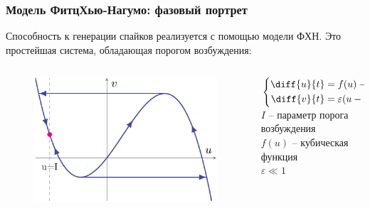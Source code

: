 \begin{frame}[t]
	\frametitle{Модель ФитцХью-Нагумо: фазовый портрет}
	Способность к генерации спайков реализуется с помощью модели ФХН. Это простейшая система, обладающая порогом возбуждения:
	\vspace{1em}
	\begin{columns}[c]
		\begin{column}{0.59\textwidth}
			\vspace{-3em}
			\begin{figure}[h]
				\centering
				\hspace{1em}\includegraphics[]{img/img_3a}
			\end{figure}
		\end{column}
		\begin{column}{0.39\textwidth}
			$
				\left\{
				\begin{aligned}
					\diff{u}{t} & =f(u)-v           \\
					\diff{v}{t} & =\varepsilon(u-I)
				\end{aligned}
				\right.
			$\\
			\vspace{1em}
			$I$ -- параметр порога возбуждения\\
			\vspace{1em}
			$f(u)$ -- кубическая функция\\
			\vspace{1em}
			$\varepsilon \ll 1$
		\end{column}
	\end{columns}
\end{frame}
